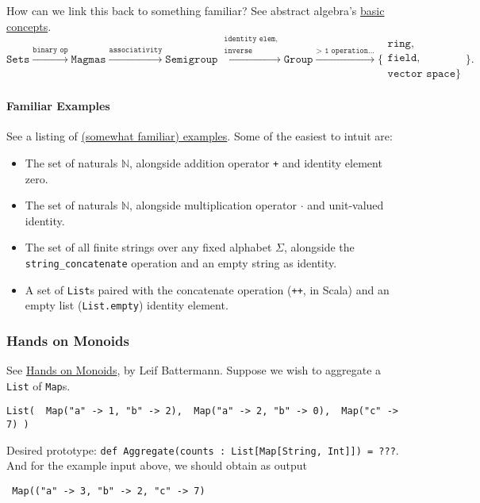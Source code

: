 \documentclass[12pt,letterpaper,twoside]{article}
\begin{document}
How can we link this back to something familiar? See abstract algebra's 
\href{https://en.wikipedia.org/wiki/Abstract_algebra#Basic_concepts}
{basic concepts}.
\[
  \texttt{Sets} 
  \overset{\texttt{binary op}}{\longrightarrow} \texttt{Magmas}
  \overset{\texttt{associativity}}{\longrightarrow} \texttt{Semigroup}
  \overset{\substack{\texttt{identity elem,} \\ \texttt{inverse}}}{\longrightarrow} \texttt{Group}
  \overset{\texttt{> 1 operation...}}{\longrightarrow} 
  \bigg\{\substack{\texttt{ring,} \\ \texttt{field,} \\ \texttt{vector space\}}}\bigg\}.
\]

\paragraph{Familiar Examples}
See a listing of \href{https://en.wikipedia.org/wiki/Monoid#Examples}
{(somewhat familiar) examples}. Some of the easiest to intuit are:
\begin{itemize}   \item The set of naturals $\mathbb N$, alongside 
    addition operator \texttt{+} and identity element zero.
  \item The set of naturals $\mathbb N$, alongside 
    multiplication operator $\cdot$ and unit-valued identity.
  \item The set of all finite strings over any fixed alphabet
    $\Sigma$, alongside the \texttt{string\_concatenate} operation
    and an empty string as identity.
  \item A set of \texttt{List}s paired with the concatenate operation
    (\texttt{++}, in Scala) and an empty list (\texttt{List.empty}) 
    identity element. \end{itemize}

\subsubsection{Hands on Monoids}
See 
\href{http://blog.leifbattermann.de/2016/11/02/hands-on-monoids-in-scala/}
{Hands on Monoids}, by Leif Battermann. Suppose we wish to aggregate a \texttt{List} of \texttt{Map}s.
\begin{verbatim}
List(  Map("a" -> 1, "b" -> 2),  Map("a" -> 2, "b" -> 0),  Map("c" -> 7) )
\end{verbatim}

Desired prototype:
\texttt{def Aggregate(counts : List[Map[String, Int]]) = ???}.
\newline And for the example input above, we should obtain as output
\begin{verbatim} Map(("a" -> 3, "b" -> 2, "c" -> 7) \end{verbatim}
\end{document}
